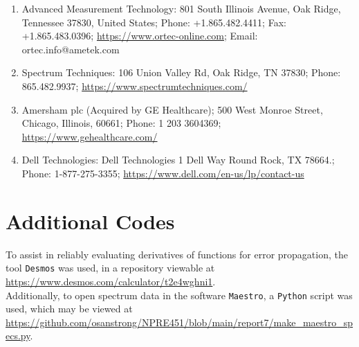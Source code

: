 \documentclass[12pt]{article}
\begin{document}
\begin{table}[!h]
\begin{tabular}{c|cccc}
    \end{tabular}
    \begin{enumerate}[label=\alph*]
        \item\label{addr:ortec}
        Advanced Measurement Technology:
        801 South Illinois Avenue,
        Oak Ridge, Tennessee 37830,
        United States;
        Phone: +1.865.482.4411;
        Fax: +1.865.483.0396;
        \url{https://www.ortec-online.com};
        Email: ortec.info@ametek.com
        \item\label{addr:spect}
        Spectrum Techniques:
        106 Union Valley Rd, Oak Ridge, TN 37830;
        Phone: 865.482.9937;
        \url{https://www.spectrumtechniques.com/}
        \item\label{addr:amer}
        Amersham plc (Acquired by GE Healthcare);
        500 West Monroe Street, Chicago, Illinois, 60661;
        Phone: 1 203 3604369;
        \url{https://www.gehealthcare.com/}
        \item\label{addr:dell}
        Dell Technologies:
        Dell Technologies
        1 Dell Way
        Round Rock, TX 78664.;
        Phone: 1-877-275-3355;
        \url{https://www.dell.com/en-us/lp/contact-us}
    \end{enumerate}
\end{table}
\FloatBarrier
\section{Additional Codes}\label{app:codes}
To assist in reliably evaluating derivatives of functions for error propagation, the tool \texttt{Desmos} was used, in a repository viewable at \url{https://www.desmos.com/calculator/t2e4wghni1}.\\

Additionally, to open spectrum data in the software \texttt{Maestro}, a \texttt{Python} script was used, which may be viewed at \url{https://github.com/osanstrong/NPRE451/blob/main/report7/make_maestro_specs.py}.
\end{document}
